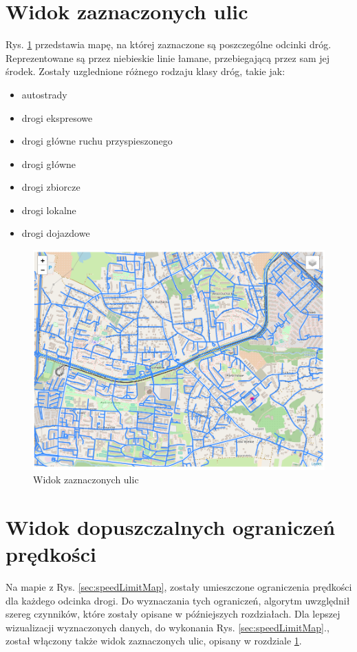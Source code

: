 \newpage
\section{Widok zaznaczonych ulic}
\label{sec:onlyStreet}

Rys. \ref{sec:onlyStreetMap} przedstawia mapę, na której zaznaczone są poszczególne odcinki dróg. Reprezentowane są przez niebieskie linie łamane, przebiegającą przez sam jej środek. Zostały uzglednione różnego rodzaju klasy dróg, takie jak: 
\begin{itemize}
\item autostrady
\item drogi ekspresowe
\item drogi główne ruchu przyspieszonego
\item drogi główne
\item drogi zbiorcze
\item drogi lokalne
\item drogi dojazdowe
\end{itemize}

\begin{figure}[h]
\caption{Widok zaznaczonych ulic}
\label{sec:onlyStreetMap}
\centering
\includegraphics[width=1.03\textwidth]{onlyStreet}
\end{figure}

\newpage
\section{Widok dopuszczalnych ograniczeń prędkości}
\label{sec:speedLimit}


Na mapie z Rys. \ref{sec:speedLimitMap}, zostały umieszczone ograniczenia prędkości dla każdego odcinka drogi. Do wyznaczania tych ograniczeń, algorytm uwzględnił szereg czynników, które zostały opisane w późniejszych rozdziałach. Dla lepszej wizualizacji wyznaczonych danych, do wykonania Rys. \ref{sec:speedLimitMap}., został włączony także widok zaznaczonych ulic, opisany w rozdziale \ref{sec:onlyStreet}.

